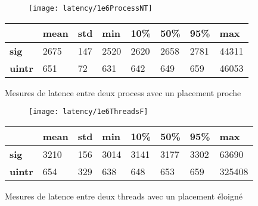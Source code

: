 \begin{figure}[H]
  \begin{subfigure}{\textwidth}
    \texttt{[image: latency/1e6ProcessNT]}
    \caption{}
    \label{subfig:latency1e6ProcessNT}
  \end{subfigure}
  \begin{subtable}{\textwidth}
    \centering
    \begin{tabular}{| l | l | l | l | l | l | l | l |}
      \hline
      &\bf mean &\bf std &\bf min  &\bf 10\% &\bf 50\% &\bf 95\% &\bf max\\
      \hline
      \bf sig   & 2675 & 147 & 2520 & 2620 & 2658 & 2781 & 44311\\
      \hline
      \bf uintr & 651  & 72  & 631  & 642  & 649  & 659  & 46053\\
      \hline
    \end{tabular}
    \caption{}
    \label{tab:latency1e6ProcessNT}
  \end{subtable}
  \caption{Mesures de latence entre deux process avec un placement proche}
  \label{fig:latency1e6ProcessNT}
\end{figure}

\begin{figure}[H]
  \begin{subfigure}{\textwidth}
    \texttt{[image: latency/1e6ThreadsF]}
    \caption{}
    \label{subfig:latency1e6ThreadsF}
  \end{subfigure}
  \begin{subtable}{\textwidth}
    \centering
    \begin{tabular}{| l | l | l | l | l | l | l | l |}
      \hline
      &\bf mean &\bf std &\bf min  &\bf 10\% &\bf 50\% &\bf 95\% &\bf max\\
      \hline
      \bf sig   & 3210 & 156 & 3014 & 3141 & 3177 & 3302 & 63690\\
      \hline
      \bf uintr & 654  & 329 & 638  & 648  & 653  & 659  & 325408\\
      \hline
    \end{tabular}
    \caption{}
    \label{tab:latency1e6ThreadsF}
  \end{subtable}
  \caption{Mesures de latence entre deux threads avec un placement éloigné}
  \label{fig:latency1e6ThreadsF}
\end{figure}

